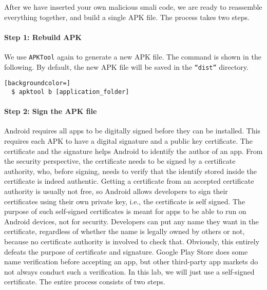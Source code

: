 After we have inserted your own malicious smali code, we are ready to reassemble everything
together, and build a single APK file. The process takes two steps.
	

\paragraph{Step 1: Rebuild APK}
We use \texttt{APKTool} again to generate a new APK file. The command is shown in the following. 
By default, the new APK file will be saved in the \texttt{“dist”}
directory.

\begin{lstlisting}[backgroundcolor=]
  $ apktool b [application_folder] 
\end{lstlisting}
 

\paragraph{Step 2: Sign the APK file}
Android requires all apps to be digitally signed before they can be installed. 
This requires each APK to have a digital signature and a public key certificate. 
The certificate and the signature helps Android to identify the 
author of an app. From the security perspective, the certificate needs to be signed by a
certificate authority, who, before signing, needs to verify that the identify stored inside the certificate is
indeed authentic. Getting a certificate from an accepted certificate authority
is usually not free, so Android allows developers
to sign their certificates using their own private key, i.e., the certificate is self signed. 
The purpose of such self-signed certificates is meant for apps to be able to run
on Android devices, not for security. Developers can put any name they want
in the certificate, regardless of whether the
name is legally owned by others or not, because no certificate authority is involved to check
that. Obviously, this entirely defeats the purpose of certificate and signature. 
Google Play Store does some name verification before accepting an app, 
but other third-party app markets do not always conduct such a
verification. In this lab, we will just use a self-signed certificate. The
entire process consists of two steps. 

